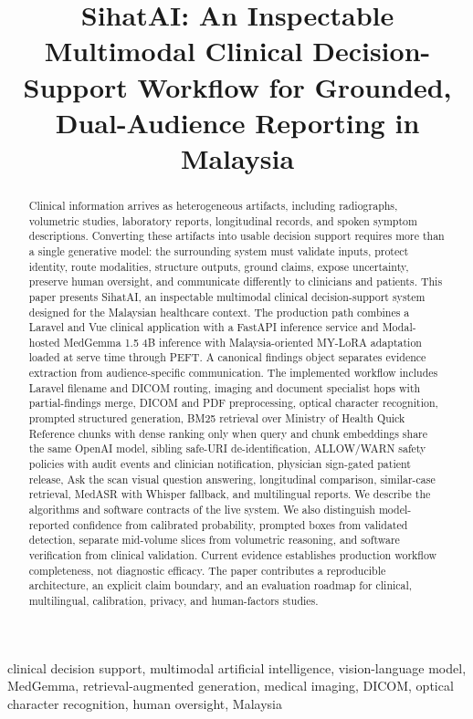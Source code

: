 \documentclass[conference]{IEEEtran}
\title{SihatAI: An Inspectable Multimodal Clinical Decision-Support Workflow for Grounded, Dual-Audience Reporting in Malaysia}
\author{
\IEEEauthorblockN{S. H. Liem\textsuperscript{*} and W. L. Kher}
\IEEEauthorblockA{\textit{Veximus Technologies}\\
Selangor, Malaysia\\
\textsuperscript{*}Corresponding author: thomasliem@veximus.com.my}
}
\begin{document}
\maketitle

\begin{abstract}
Clinical information arrives as heterogeneous artifacts, including radiographs, volumetric studies, laboratory reports, longitudinal records, and spoken symptom descriptions. Converting these artifacts into usable decision support requires more than a single generative model: the surrounding system must validate inputs, protect identity, route modalities, structure outputs, ground claims, expose uncertainty, preserve human oversight, and communicate differently to clinicians and patients. This paper presents SihatAI, an inspectable multimodal clinical decision-support system designed for the Malaysian healthcare context. The production path combines a Laravel and Vue clinical application with a FastAPI inference service and Modal-hosted MedGemma 1.5 4B inference with Malaysia-oriented MY-LoRA adaptation loaded at serve time through PEFT. A canonical findings object separates evidence extraction from audience-specific communication. The implemented workflow includes Laravel filename and DICOM routing, imaging and document specialist hops with partial-findings merge, DICOM and PDF preprocessing, optical character recognition, prompted structured generation, BM25 retrieval over Ministry of Health Quick Reference chunks with dense ranking only when query and chunk embeddings share the same OpenAI model, sibling safe-URI de-identification, ALLOW/WARN safety policies with audit events and clinician notification, physician sign-gated patient release, Ask the scan visual question answering, longitudinal comparison, similar-case retrieval, MedASR with Whisper fallback, and multilingual reports. We describe the algorithms and software contracts of the live system. We also distinguish model-reported confidence from calibrated probability, prompted boxes from validated detection, separate mid-volume slices from volumetric reasoning, and software verification from clinical validation. Current evidence establishes production workflow completeness, not diagnostic efficacy. The paper contributes a reproducible architecture, an explicit claim boundary, and an evaluation roadmap for clinical, multilingual, calibration, privacy, and human-factors studies.
\end{abstract}

\begin{IEEEkeywords}
clinical decision support, multimodal artificial intelligence, vision-language model, MedGemma, retrieval-augmented generation, medical imaging, DICOM, optical character recognition, human oversight, Malaysia
\end{IEEEkeywords}
\end{document}
